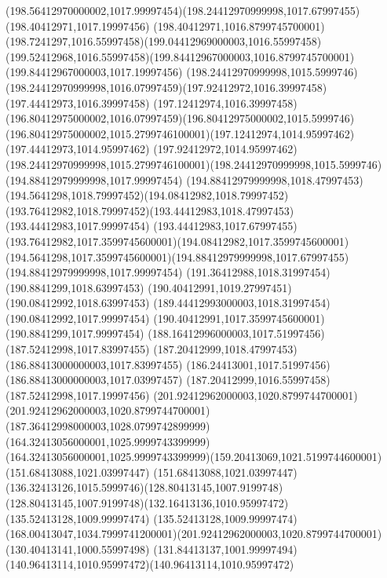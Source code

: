 {{	\curveto(198.56412970000002,1017.99997454)(198.24412970999998,1017.67997455)(198.40412971,1017.19997456)
	\curveto(198.40412971,1016.8799745700001)(198.7241297,1016.55997458)(199.04412969000003,1016.55997458)
	\curveto(199.52412968,1016.55997458)(199.84412967000003,1016.8799745700001)(199.84412967000003,1017.19997456)
	\closepath
	\moveto(198.24412970999998,1015.5999746)
	\curveto(198.24412970999998,1016.07997459)(197.92412972,1016.39997458)(197.44412973,1016.39997458)
	\curveto(197.12412974,1016.39997458)(196.80412975000002,1016.07997459)(196.80412975000002,1015.5999746)
	\curveto(196.80412975000002,1015.2799746100001)(197.12412974,1014.95997462)(197.44412973,1014.95997462)
	\curveto(197.92412972,1014.95997462)(198.24412970999998,1015.2799746100001)(198.24412970999998,1015.5999746)
	\closepath
	\moveto(194.88412979999998,1017.99997454)
	\curveto(194.88412979999998,1018.47997453)(194.5641298,1018.79997452)(194.08412982,1018.79997452)
	\curveto(193.76412982,1018.79997452)(193.44412983,1018.47997453)(193.44412983,1017.99997454)
	\curveto(193.44412983,1017.67997455)(193.76412982,1017.3599745600001)(194.08412982,1017.3599745600001)
	\curveto(194.5641298,1017.3599745600001)(194.88412979999998,1017.67997455)(194.88412979999998,1017.99997454)
	\closepath
	\moveto(191.36412988,1018.31997454)
	\lineto(190.8841299,1018.63997453)
	\lineto(190.40412991,1019.27997451)
	\lineto(190.08412992,1018.63997453)
	\lineto(189.44412993000003,1018.31997454)
	\lineto(190.08412992,1017.99997454)
	\lineto(190.40412991,1017.3599745600001)
	\lineto(190.8841299,1017.99997454)
	\closepath
	\moveto(188.16412996000003,1017.51997456)
	\lineto(187.52412998,1017.83997455)
	\lineto(187.20412999,1018.47997453)
	\lineto(186.88413000000003,1017.83997455)
	\lineto(186.24413001,1017.51997456)
	\lineto(186.88413000000003,1017.03997457)
	\lineto(187.20412999,1016.55997458)
	\lineto(187.52412998,1017.19997456)
	\closepath
	\moveto(201.92412962000003,1020.8799744700001)
	\curveto(201.92412962000003,1020.8799744700001)(187.36412998000003,1028.0799742899999)(164.32413056000001,1025.9999743399999)
	\curveto(164.32413056000001,1025.9999743399999)(159.20413069,1021.5199744600001)(151.68413088,1021.03997447)
	\curveto(151.68413088,1021.03997447)(136.32413126,1015.5999746)(128.80413145,1007.9199748)
	\curveto(128.80413145,1007.9199748)(132.16413136,1010.95997472)(135.52413128,1009.99997474)
	\curveto(135.52413128,1009.99997474)(168.00413047,1034.7999741200001)(201.92412962000003,1020.8799744700001)
	\closepath
	\moveto(130.40413141,1000.55997498)
	\curveto(131.84413137,1001.99997494)(140.96413114,1010.95997472)(140.96413114,1010.95997472)
}}
